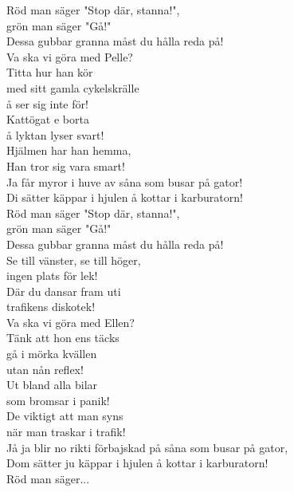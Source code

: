 \documentclass[12pt]{article}
\begin{document}
\noindent
\begin{minipage}{0.45\textwidth}
	\noindent
	Röd man säger "Stop där, stanna!",\\
	grön man säger "Gå!"\\
	Dessa gubbar granna måst du hålla reda på!\\
	
	\noindent
	Va ska vi göra med Pelle?\\
	Titta hur han kör\\
	med sitt gamla cykelskrälle\\
	å ser sig inte för!\\
	Kattögat e borta\\
	å lyktan lyser svart!\\
	Hjälmen har han hemma,\\
	Han tror sig vara smart!\\
	
	\noindent
	Ja får myror i huve av såna som busar på gator!\\
	Di sätter käppar i hjulen å kottar i karburatorn!\\

	\noindent
	Röd man säger "Stop där, stanna!",\\
	grön man säger "Gå!"\\
	Dessa gubbar granna måst du hålla reda på!\\
	Se till vänster, se till höger,\\
	ingen plats för lek!\\
	Där du dansar fram uti\\
	trafikens diskotek!\\
	
	
	\noindent
	Va ska vi göra med Ellen?\\
	Tänk att hon ens täcks\\
	gå i mörka kvällen\\
	utan nån reflex!\\
	Ut bland alla bilar\\
	som bromsar i panik!\\
	De viktigt att man syns\\
	när man traskar i trafik!\\

	\noindent
	Jå ja blir no rikti förbajskad på såna som busar på gator,\\
	Dom sätter ju käppar i hjulen å kottar i karburatorn!\\
	
	Röd man säger...\\
\end{minipage}%
\end{document}
